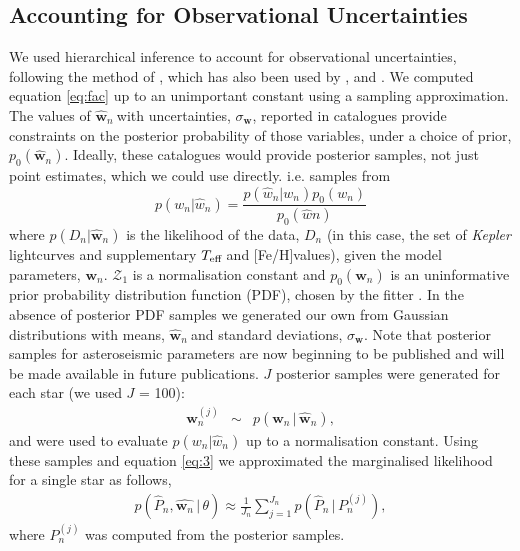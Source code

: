 \documentclass[11pt,preprint]{aastex}
\newcommand{\logg}{log \emph{g}}
\newcommand{\teff}{$T_{\rm{eff}}$}
\newcommand{\w}{\mathbf{w}}
\newcommand{\wh}{$\hat{\mathbf{w}}_n$}
\newcommand{\feh}{[Fe/H]}
\begin{document}
\subsection{Accounting for Observational Uncertainties}

We used hierarchical inference to account for observational uncertainties,
following the method of \citet{Hogg2010}, which has also been used by
\citet{Foreman-Mackey2014}, \citet{Rogers2014} and \citet{Morton2014}.
We computed equation \ref{eq:fac} up to an unimportant constant
using a sampling approximation.
The values of \wh$~$with uncertainties, $\sigma_{\mathbf{w}}$, reported in
catalogues provide constraints on the posterior probability of those
variables, under a choice of prior, $p_0(\hat{\mathbf{w}}_n)$.
Ideally, these catalogues would provide posterior samples, not just point
estimates, which we could use directly.
i.e. samples from
\begin{equation}
	p(w_n|\hat{w}_n) = \frac{p(\hat{w}_n|w_n)p_0(w_n)}{p_0(\hat{w}n)}
\end{equation}
where $p(D_n|\hat{\w}_n)$ is the likelihood of the data, $D_n$ (in this case,
the set of {\it Kepler} lightcurves and supplementary \teff$~$and \feh values),
given the model parameters, $\w_n$.
$\mathcal{Z}_1$ is a normalisation constant and $p_0(\hat{\w}_n)$ is an
uninformative prior probability distribution function (PDF), chosen by the
fitter \citep[][used a flat prior in age and \logg]{Chaplin2014}.
In the absence of posterior PDF samples we generated our own from Gaussian
distributions with means, \wh$~$and standard deviations, $\sigma_{\mathbf{w}}$.
Note that posterior samples for asteroseismic parameters are now beginning to
be published and will be made available in future publications.
$J$ posterior samples were generated for each star (we used $J$ = 100):
\begin{eqnarray}
\w_n^{(j)} &\sim& p(\w_n\,|\,\hat{\w}_n),
\end{eqnarray}
and were used to evaluate $p(w_n|\hat{w}_n)$ up to a normalisation constant.
Using these samples and equation \ref{eq:3} we approximated the marginalised
likelihood for a single star as follows,
\begin{align}
	p(\hat{P}_n,\hat{\w_n}\,|\,\theta) \approx \frac{1}{J_n}
	\sum_{j=1}^{J_n}p(\hat{P}_n\,|\,P_n^{(j)}),
\end{align}
where $P_n^{(j)}$ was computed from the posterior samples.
\end{document}
